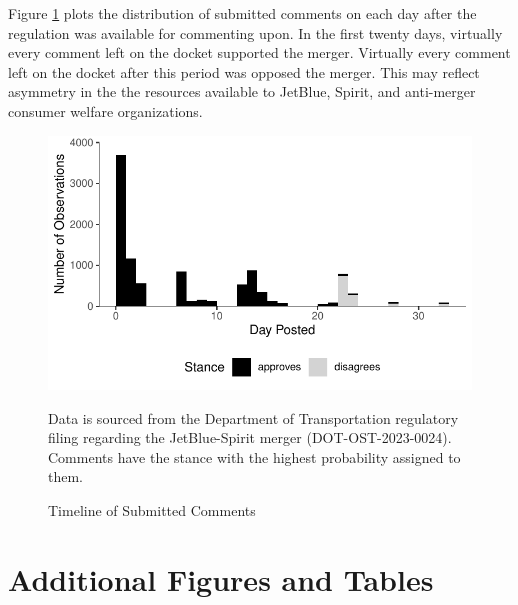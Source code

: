 \documentclass{article}
\begin{document}
\begin{appendices}
Figure \ref{fig:CommentTimeline} plots the distribution of submitted comments on each day after the regulation was available for commenting upon. In the first twenty days, virtually every comment left on the docket supported the merger. Virtually every comment left on the docket after this period was opposed the merger. This may reflect asymmetry in the the resources available to JetBlue, Spirit, and anti-merger consumer welfare organizations.  

    \begin{figure}[h]
		\caption{Timeline of Submitted Comments}
		\label{fig:CommentTimeline}
        \begin{center}
    	\includegraphics{stance_submission_timeline}
        \end{center}
		\begin{minipage}{\textwidth} 
			{\footnotesize Data is sourced from the Department of Transportation regulatory filing regarding the JetBlue-Spirit merger  (DOT-OST-2023-0024). Comments have the stance with the highest probability assigned to them.} 
		\end{minipage}
	\end{figure}
	
	
	\FloatBarrier
	\pagebreak
	\section{Additional Figures and Tables}	
    \setcounter{table}{0}
    \setcounter{figure}{0}



\end{appendices}
\end{document}
